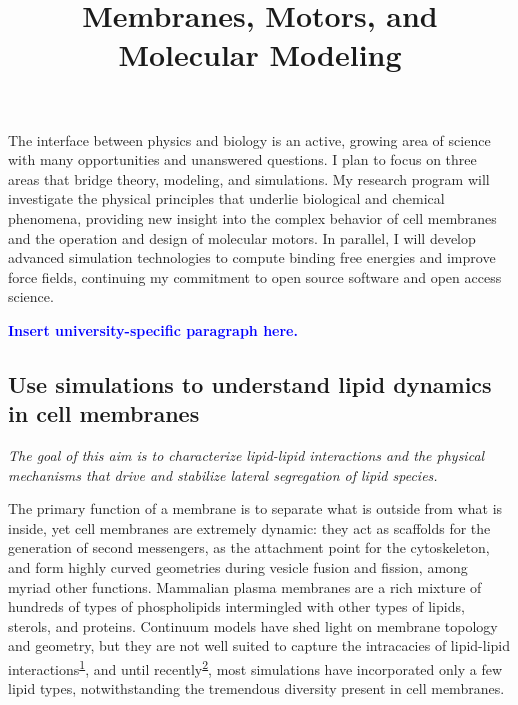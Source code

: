 \documentclass[11pt,notitlepage]{article}
\title{\large \vspace{-0.75in} \textbf{Membranes, Motors, and Molecular Modeling} \vspace{-1in} }
\date{}
\begin{document}

\maketitle
\thispagestyle{title}


The interface between physics and biology is an active, growing area of
science with many opportunities and unanswered questions. I plan to
focus on three areas that bridge theory, modeling, and simulations. My
research program will investigate the physical principles that underlie
biological and chemical phenomena, providing new insight into the
complex behavior of cell membranes and the operation and design of
molecular motors. In parallel, I will develop advanced simulation
technologies to compute binding free energies and improve force fields,
continuing my commitment to open source software and open access
science.

\textcolor{blue}{\textbf{Insert university-specific paragraph here.}}

\hypertarget{use-simulations-to-understand-lipid-dynamics-in-cell-membranes}{%
\subsection{Use simulations to understand lipid dynamics in cell
membranes}\label{use-simulations-to-understand-lipid-dynamics-in-cell-membranes}}

\emph{The goal of this aim is to characterize lipid-lipid interactions
and the physical mechanisms that drive and stabilize lateral segregation
of lipid species.}

The primary function of a membrane is to separate what is outside from
what is inside, yet cell membranes are extremely dynamic: they act as
scaffolds for the generation of second messengers, as the attachment
point for the cytoskeleton, and form highly curved geometries during
vesicle fusion and fission, among myriad other functions. Mammalian
plasma membranes are a rich mixture of hundreds of types of
phospholipids intermingled with other types of lipids, sterols, and
proteins. Continuum models have shed light on membrane topology and
geometry, but they are not well suited to capture the intracacies of
lipid-lipid
interactions\textsuperscript{\protect\hyperlink{ref-w5pYOl69}{1}}, and
until recently\textsuperscript{\protect\hyperlink{ref-1Dvbhukpz}{2}},
most simulations have incorporated only a few lipid types,
notwithstanding the tremendous diversity present in cell membranes.
\end{document}

